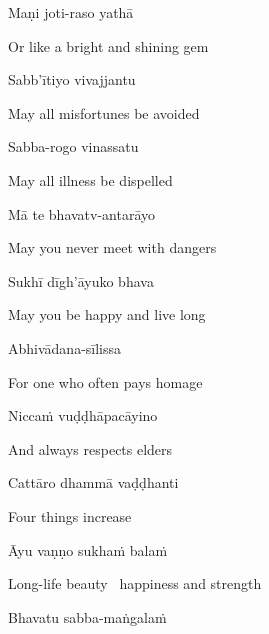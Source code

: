 Maṇi joti-raso yathā

\begin{english}
  Or like a bright and shining gem\\
\end{english}

Sabb'ītiyo vivajjantu

\begin{english}
  May all misfortunes be avoided
\end{english}

Sabba-rogo vinassatu

\begin{english}
  May all illness be dispelled
\end{english}

Mā te bhavatv-antarāyo

\begin{english}
  May you never meet with dangers
\end{english}

Sukhī dīgh'āyuko bhava

\begin{english}
  May you be happy and live long
\end{english}

Abhivādana-sīlissa

\begin{english}
  For one who often pays homage
\end{english}

Niccaṁ vuḍḍhāpacāyino

\begin{english}
  And always respects elders
\end{english}

Cattāro dhammā vaḍḍhanti

\begin{english}
  Four things increase
\end{english}

Āyu vaṇṇo sukhaṁ balaṁ

\begin{english}
  Long-life beauty \breathmark\ happiness and strength
\end{english}

Bhavatu sabba-maṅgalaṁ


